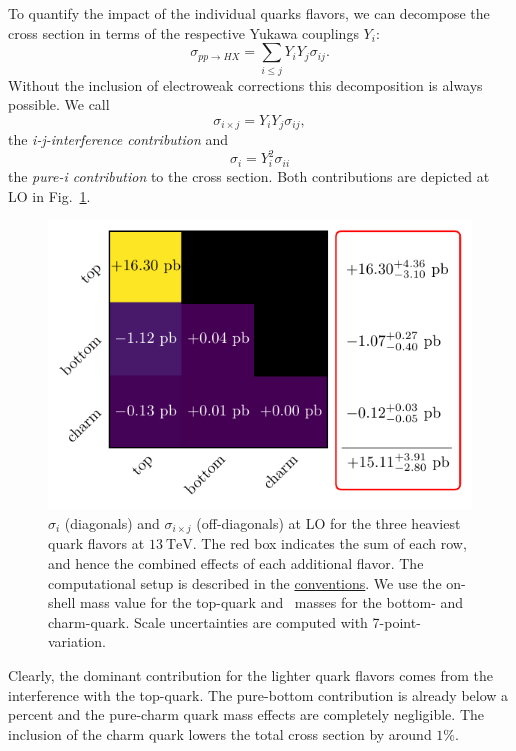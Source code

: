 To quantify the impact of the individual quarks flavors, we can decompose the cross section in terms of the respective Yukawa couplings $Y_i$:
\begin{equation}
\sigma_{pp \rightarrow HX} =  \sum_{i\le j} Y_i Y_j \sigma_{i j}.
\end{equation}
Without the inclusion of electroweak corrections this decomposition is always possible. We call
\begin{equation}
\sigma_{i \times j} = Y_i Y_j \sigma_{ij},
\end{equation}
the \textit{i-j-interference contribution} and
\begin{equation}
\sigma_{i} = Y_i^2 \sigma_{ii}
\end{equation}
the \textit{pure-i contribution} to the cross section. Both contributions are depicted at \acs{LO} in Fig.~\ref{fig:4:quark_effects}.
\begin{figure}[ht]
\centering
\includegraphics[scale=0.9]{Images/quark_effects_LO.pdf}
\caption{$\sigma_{i}$ (diagonals) and $\sigma_{i \times j}$ (off-diagonals) at \acs{LO} for the three heaviest quark flavors at $13\ \mathrm{TeV}$. The red box indicates the sum of each row, and hence the combined effects of each additional flavor. The computational setup is described in the \hyperref[chap:notation_and_conventions]{conventions}. We use the on-shell mass value for the top-quark and \MS\ masses for the bottom- and charm-quark. Scale uncertainties are computed with 7-point-variation.}
\label{fig:4:quark_effects}
\end{figure}
Clearly, the dominant contribution for the lighter quark flavors comes from the interference with the top-quark. The pure-bottom contribution is already below a percent and the pure-charm quark mass effects are completely negligible. The inclusion of the charm quark lowers the total cross section by around $1\%$.


